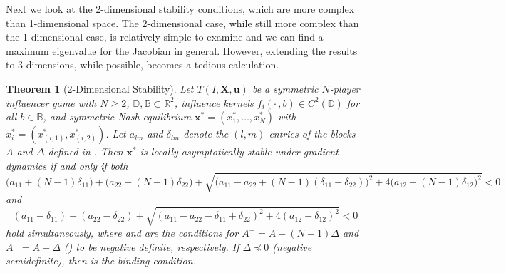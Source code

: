 \documentclass{article}
\newtheorem{theorem}{Theorem}[section]
\begin{document}
            Next we look at the 2-dimensional stability conditions, which are more complex than 1-dimensional space. The 2-dimensional case, while still more complex than the 1-dimensional case, is relatively simple to examine and we can find a maximum eigenvalue for the Jacobian in general. However, extending the results to 3 dimensions, while possible, becomes a tedious calculation.
            \begin{theorem}[2-Dimensional Stability]\label{thm:SI_two_dimensional_stability}
                Let $T(I,\mathbf{X},\mathbf{u})$ be a symmetric $N$-player influencer game with $N\geq 2$, $\mathbb{D}, \mathbb{B} \subset \mathbb{R}^2$, influence kernels $f_i(\cdot\,,b) \in C^2(\mathbb{D})$ for all $b \in \mathbb{B}$, and symmetric Nash equilibrium $\mathbf{x}^* = (x_1^*,\dots,x_N^*)$ with $x_i^* = (x_{(i,1)}^*, x_{(i,2)}^*)$. Let $a_{lm}$ and $\delta_{lm}$ denote the $(l,m)$ entries of the blocks $A$ and $\Delta$ defined in . Then $\mathbf{x}^*$ is locally asymptotically stable under gradient dynamics if and only if both
                \begin{equation}\label{eq:SI_stab_plus}
                    \bigl(a_{11}+(N-1)\delta_{11}\bigr) + \bigl(a_{22}+(N-1)\delta_{22}\bigr) + 
                    \sqrt{\bigl(a_{11}-a_{22}+(N-1)(\delta_{11}-\delta_{22})\bigr)^2 + 
                    4\bigl(a_{12}+(N-1)\delta_{12}\bigr)^2} < 0
                \end{equation}
                and
                \begin{equation}\label{eq:SI_stab_minus}
                    (a_{11}-\delta_{11}) + (a_{22}-\delta_{22}) + 
                    \sqrt{(a_{11}-a_{22}-\delta_{11}+\delta_{22})^2 + 
                    4(a_{12}-\delta_{12})^2} < 0
                \end{equation}
                hold simultaneously, where  and  are the conditions for $A^+ = A+(N-1)\Delta$ and $A^- = A-\Delta$ () to be negative definite, respectively. If $\Delta \preceq 0$ (negative semidefinite), then  is the binding condition.
            \end{theorem}
\end{document}
